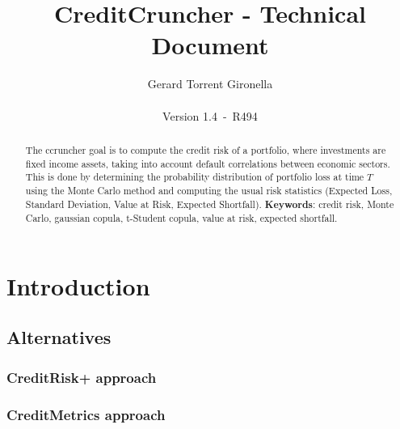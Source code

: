 \documentclass[a4paper,12pt,final]{article}
\def\numversion{1.4}
\def\svnversion{R494}
\begin{document}
\title{CreditCruncher - Technical Document}
\author{Gerard Torrent Gironella\\\\Version \numversion\ -\ \svnversion}
\date{}
\maketitle


\begin{abstract}
The ccruncher goal is to compute the credit risk of a portfolio, where 
investments are fixed income assets, taking into account default correlations
between economic sectors. This is done by determining the probability distribution 
of portfolio loss at time $T$ using the Monte Carlo method and computing the
usual risk statistics (Expected Loss, Standard Deviation, Value at Risk, Expected 
Shortfall).
\newline
\newline
\textbf{Keywords}: credit risk, Monte Carlo, gaussian copula, t-Student copula,
value at risk, expected shortfall.
\end{abstract}
\newpage


\tableofcontents
\newpage


\section{Introduction}


\subsection{Alternatives}

\subsubsection{CreditRisk+ approach}

\subsubsection{CreditMetrics approach}
\end{document}
